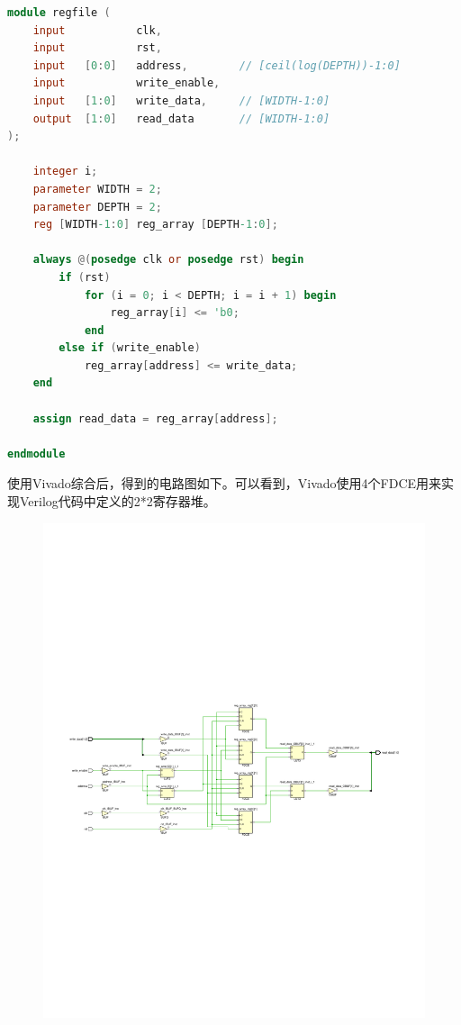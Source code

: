 \documentclass{ctexart}
\begin{document}
\begin{lstlisting}[language=Verilog]
module regfile (
    input           clk,
    input           rst,
    input   [0:0]   address,        // [ceil(log(DEPTH))-1:0]
    input           write_enable,
    input   [1:0]   write_data,     // [WIDTH-1:0]
    output  [1:0]   read_data       // [WIDTH-1:0]
);

    integer i;
    parameter WIDTH = 2;
    parameter DEPTH = 2;
    reg [WIDTH-1:0] reg_array [DEPTH-1:0];

    always @(posedge clk or posedge rst) begin
        if (rst)
            for (i = 0; i < DEPTH; i = i + 1) begin
                reg_array[i] <= 'b0;
            end
        else if (write_enable)
            reg_array[address] <= write_data;
    end
    
    assign read_data = reg_array[address];

endmodule
\end{lstlisting}

使用Vivado综合后，得到的电路图如下。可以看到，Vivado使用4个FDCE用来实现Verilog代码中定义的2*2寄存器堆。

\begin{figure}[H]
    \centering
    \includegraphics[width=\textwidth]{lab3/schematic.pdf}
\end{figure}
\end{document}
